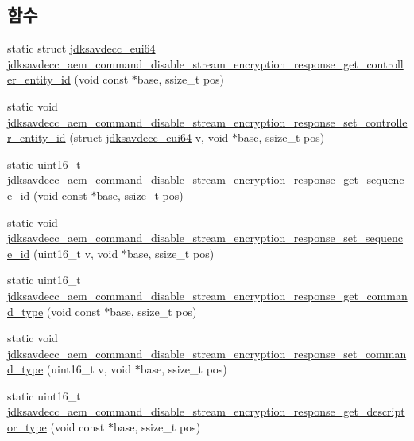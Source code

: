 \subsection*{함수}
\begin{DoxyCompactItemize}
\item 
static struct \hyperlink{structjdksavdecc__eui64}{jdksavdecc\+\_\+eui64} \hyperlink{group__command__disable__stream__encryption__response_gad70504805e502f587dddd43c36931e0b}{jdksavdecc\+\_\+aem\+\_\+command\+\_\+disable\+\_\+stream\+\_\+encryption\+\_\+response\+\_\+get\+\_\+controller\+\_\+entity\+\_\+id} (void const $\ast$base, ssize\+\_\+t pos)
\item 
static void \hyperlink{group__command__disable__stream__encryption__response_ga3b7cef6839d51cc08bf5996015d7f9d4}{jdksavdecc\+\_\+aem\+\_\+command\+\_\+disable\+\_\+stream\+\_\+encryption\+\_\+response\+\_\+set\+\_\+controller\+\_\+entity\+\_\+id} (struct \hyperlink{structjdksavdecc__eui64}{jdksavdecc\+\_\+eui64} v, void $\ast$base, ssize\+\_\+t pos)
\item 
static uint16\+\_\+t \hyperlink{group__command__disable__stream__encryption__response_ga7c162e95198aa3afc9a1fa915c6017c4}{jdksavdecc\+\_\+aem\+\_\+command\+\_\+disable\+\_\+stream\+\_\+encryption\+\_\+response\+\_\+get\+\_\+sequence\+\_\+id} (void const $\ast$base, ssize\+\_\+t pos)
\item 
static void \hyperlink{group__command__disable__stream__encryption__response_ga8692c50f66ab885f5eca3a9ba2e96536}{jdksavdecc\+\_\+aem\+\_\+command\+\_\+disable\+\_\+stream\+\_\+encryption\+\_\+response\+\_\+set\+\_\+sequence\+\_\+id} (uint16\+\_\+t v, void $\ast$base, ssize\+\_\+t pos)
\item 
static uint16\+\_\+t \hyperlink{group__command__disable__stream__encryption__response_gaa0973fda7a4d8e7d5e9551a5a5ba346a}{jdksavdecc\+\_\+aem\+\_\+command\+\_\+disable\+\_\+stream\+\_\+encryption\+\_\+response\+\_\+get\+\_\+command\+\_\+type} (void const $\ast$base, ssize\+\_\+t pos)
\item 
static void \hyperlink{group__command__disable__stream__encryption__response_gacb7b267187d94bde7fca541703f3bf91}{jdksavdecc\+\_\+aem\+\_\+command\+\_\+disable\+\_\+stream\+\_\+encryption\+\_\+response\+\_\+set\+\_\+command\+\_\+type} (uint16\+\_\+t v, void $\ast$base, ssize\+\_\+t pos)
\item 
static uint16\+\_\+t \hyperlink{group__command__disable__stream__encryption__response_ga05227a24d6e4b6b5448fffebf489a500}{jdksavdecc\+\_\+aem\+\_\+command\+\_\+disable\+\_\+stream\+\_\+encryption\+\_\+response\+\_\+get\+\_\+descriptor\+\_\+type} (void const $\ast$base, ssize\+\_\+t pos)

\end{DoxyCompactItemize}
